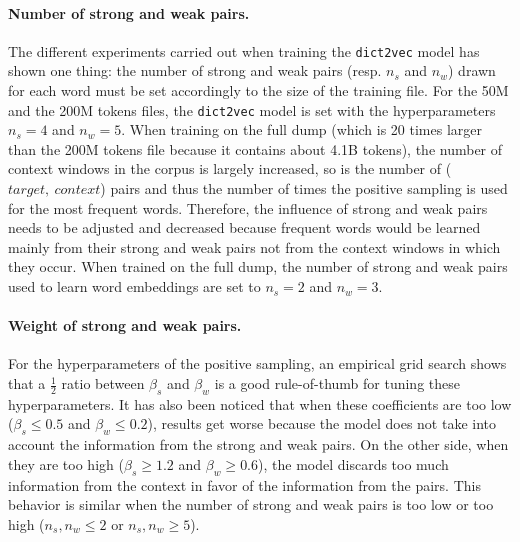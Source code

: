     \paragraph{Number of strong and weak pairs.}
      The different experiments carried out when training the \texttt{dict2vec}
      model has shown one thing: the number of strong and weak pairs (resp.
      $n_s$ and $n_w$) drawn for each word must be set accordingly to the size
      of the training file. For the 50M and the 200M tokens files, the
      \texttt{dict2vec} model is set with the hyperparameters $n_s = 4$ and $n_w
      = 5$. When training on the full dump (which is 20 times larger than the
      200M tokens file because it contains about 4.1B tokens), the number of
      context windows in the corpus is largely increased, so is the number of
      ($target,~context$) pairs and thus the number of times the positive
      sampling is used for the most frequent words. Therefore, the influence of
      strong and weak pairs needs to be adjusted and decreased because frequent
      words would be learned mainly from their strong and weak pairs not from
      the context windows in which they occur. When trained on the full dump,
      the number of strong and weak pairs used to learn word embeddings are set
      to $n_s = 2$ and $n_w = 3$.

    \paragraph{Weight of strong and weak pairs.}
      For the hyperparameters of the positive sampling, an empirical grid search
      shows that a $\frac{1}{2}$ ratio between $\beta_s$ and $\beta_w$ is a good
      rule-of-thumb for tuning these hyperparameters. It has also been noticed
      that when these coefficients are too low ($\beta_s \leq 0.5$ and $\beta_w
      \leq 0.2$), results get worse because the model does not take into account
      the information from the strong and weak pairs. On the other side, when
      they are too high ($\beta_s \geq 1.2$ and $\beta_w \geq 0.6$), the model
      discards too much information from the context in favor of the information
      from the pairs. This behavior is similar when the number of strong and
      weak pairs is too low or too high ($n_s, n_w \leq 2$ or $n_s, n_w \geq
      5$).

